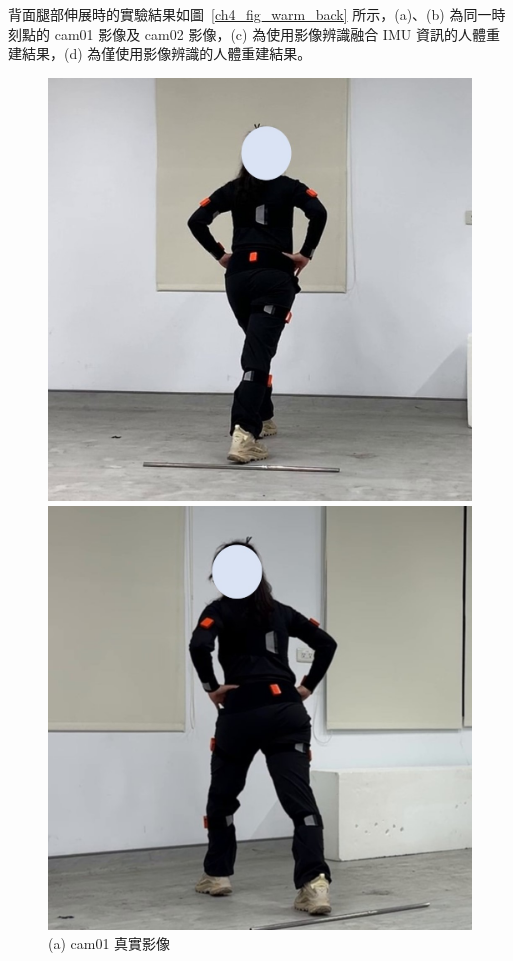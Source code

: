 \clearpage

背面腿部伸展時的實驗結果如圖~\ref{ch4_fig_warm_back} 所示，(a)、(b) 為同一時刻點的 cam01 影像及 cam02 影像，(c) 為使用影像辨識融合 IMU 資訊的人體重建結果，(d) 為僅使用影像辨識的人體重建結果。

\begin{figure}[!ht]
   \centering
   \begin{minipage}{.5\textwidth}
      \centering
      \includegraphics[width=.95\linewidth]{figure/ch4_fig_warm_cam01_with4.jpg}
      \caption*{(a) cam01 真實影像}
    \end{minipage}%
    \begin{minipage}{.5\textwidth}
       \centering
       \includegraphics[width=.95\linewidth]{figure/ch4_fig_warm_cam02_with4.jpg}

\end{minipage}
\end{figure}
